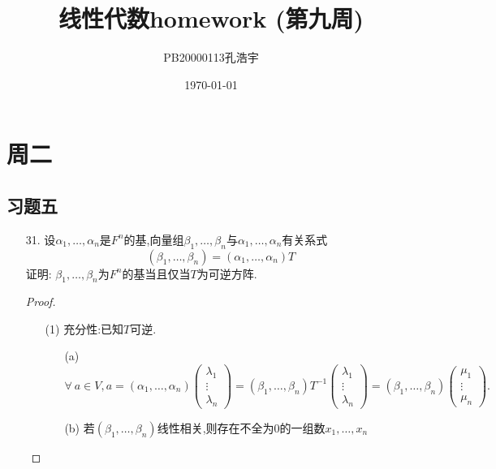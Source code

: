\documentclass{article}
\title{线性代数homework (第九周)}
\author{PB20000113孔浩宇}
\date{\today}
\begin{document}
\maketitle
\section{周二}
\subsection{习题五}
\begin{enumerate}
    \item [31.]设$\alpha_1,\ldots,\alpha_n$是$F^n$的基,向量组$\beta_1,\ldots,\beta_n$与$\alpha_1,\ldots,\alpha_n$有关系式
    \[(\beta_1,\ldots,\beta_n)=(\alpha_1,\ldots,\alpha_n)T\]
    证明: $\beta_1,\ldots,\beta_n$为$F^n$的基当且仅当$T$为可逆方阵.
    \begin{proof}
        \begin{enumerate}
            \item []
            \item [(1)]充分性:已知$T$可逆.
            \begin{enumerate}
                \item [(a)]
                \[
                    \forall\ a\in V,a=(\alpha_1,\ldots,\alpha_n)
                    \begin{pmatrix}
                        \lambda_1\\
                        \vdots\\
                        \lambda_n
                    \end{pmatrix}
                    =(\beta_1,\ldots,\beta_n)T^{-1}
                    \begin{pmatrix}
                        \lambda_1\\
                        \vdots\\
                        \lambda_n
                    \end{pmatrix}
                    =(\beta_1,\ldots,\beta_n)
                    \begin{pmatrix}
                        \mu_1\\
                        \vdots\\
                        \mu_n
                    \end{pmatrix}.
                \]
                \item [(b)]若$(\beta_1,\ldots,\beta_n)$线性相关,则存在不全为$0$的一组数$x_1,\ldots,x_n$

\end{enumerate}
\end{enumerate}
\end{proof}
\end{enumerate}
\end{document}

